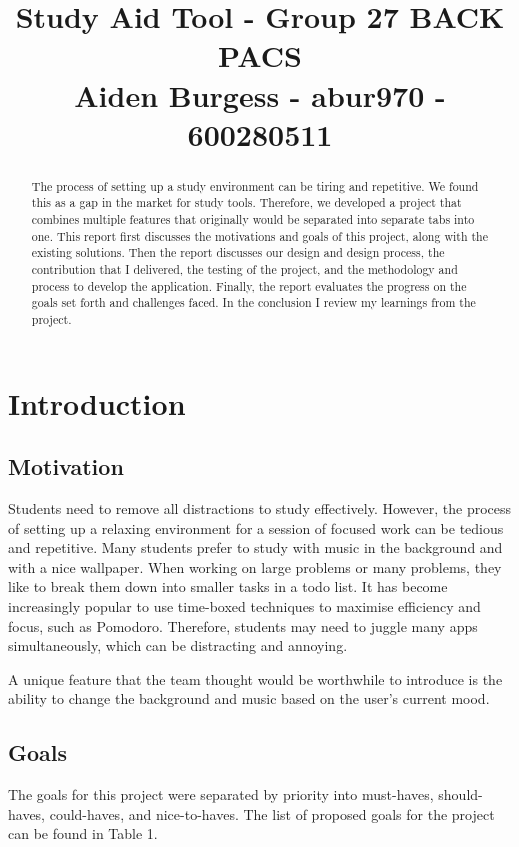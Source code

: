 \documentclass[conference]{IEEEtran}
\begin{document}
\title{Study Aid Tool - Group 27 BACK PACS \\
{\large Aiden Burgess - abur970 - 600280511}
}
\maketitle
\begin{abstract}
The process of setting up a study environment can be tiring and repetitive. We found this as a gap in the market for study tools. Therefore, we developed a project that combines multiple features that originally would be separated into separate tabs into one. This report first discusses the motivations and goals of this project, along with the existing solutions. Then the report discusses our design and design process, the contribution that I delivered, the testing of the project, and the methodology and process to develop the application. Finally, the report evaluates the progress on the goals set forth and challenges faced. In the conclusion I review my learnings from the project.
\end{abstract}

\section{Introduction}
\subsection{Motivation}
Students need to remove all distractions to study effectively. However, the process of setting up a relaxing environment for a session of focused work can be tedious and repetitive. Many students prefer to study with music in the background and with a nice wallpaper. When working on large problems or many problems, they like to break them down into smaller tasks in a todo list. It has become increasingly popular to use time-boxed techniques to maximise efficiency and focus, such as Pomodoro. Therefore, students may need to juggle many apps simultaneously, which can be distracting and annoying.

A unique feature that the team thought would be worthwhile to introduce is the ability to change the background and music based on the user's current mood.

\subsection{Goals}
The goals for this project were separated by priority into must-haves, should-haves, could-haves, and nice-to-haves. The list of proposed goals for the project can be found in Table 1.
\end{document}
